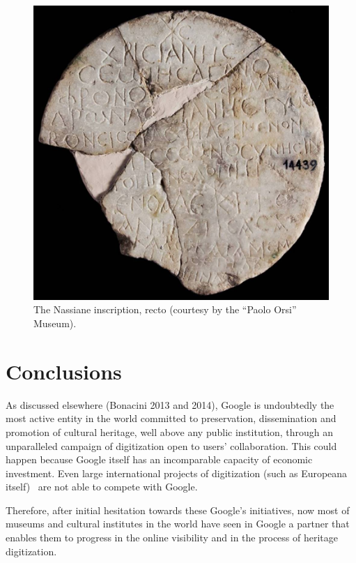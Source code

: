 \documentclass[amsthm,ebook]{saparticle}
\begin{document}
\begin{figure}[!bp]
\centering
 \includegraphics[width=\columnwidth]{EAGLE2016BONACINIPilotprojectatPaoloOrsiMuseum-img006.jpg}
\caption{ The Nassiane inscription, recto (courtesy by the ``Paolo Orsi'' Museum). }
\label{fig:6}
\end{figure}

\section{Conclusions}


\noindent As discussed elsewhere (Bonacini 2013 and 2014), Google is undoubtedly the most active entity in the world committed to
preservation, dissemination and promotion of cultural heritage, well above any public institution, through an
unparalleled campaign of digitization open to users’ collaboration. This could happen because Google itself has an
incomparable capacity of economic investment. Even large international projects of digitization (such as Europeana
itself) \ are not able to compete with Google.

Therefore, after initial hesitation towards these Google’s initiatives, now most of museums and cultural institutes in
the world have seen in Google a partner that enables them to progress in the online visibility and in the process of
heritage digitization.
\end{document}
